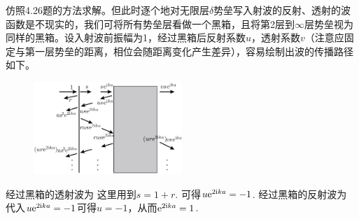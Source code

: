 \begin{enumerate}[label=\textbf{4.\arabic*}, listparindent=\parindent, leftmargin=-0.5mm]
仿照4.26题的方法求解。但此时逐个地对无限层$\delta$势垒写入射波的反射、透射的波函数是不现实的，我们可将所有势垒层看做一个黑箱，且将第2层到$\infty$层势垒视为同样的黑箱。设入射波前振幅为1，经过黑箱后反射系数$u$，透射系数$v$（注意应固定与第一层势垒的距离，相位会随距离变化产生差异），容易绘制出波的传播路径如下。
\begin{figure}[!ht]
    \centering
    \includegraphics[width=0.5\textwidth]{pic/delta2.JPG}
    \label{fig:my_label}
\end{figure}

经过黑箱的透射波为
这里用到$s=1+r$. 可得$u\mathrm{e}^{2\mathrm{i} ka}=-1$. 经过黑箱的反射波为
代入$u\mathrm{e}^{2\mathrm{i} ka}=-1$可得$u=-1$，从而$\mathrm{e}^{2\mathrm{i} ka}=1$.

\end{enumerate}

